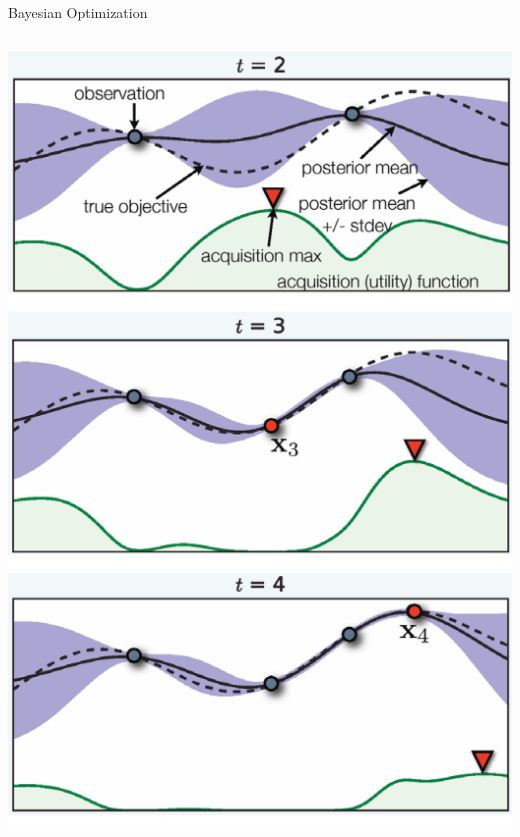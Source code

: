\begin{frame}[c,fragile]{Bayesian Optimization }

\begin{columns}


\includegraphics[width=\textwidth]{images/bo_pic1.png}\\
\pause
\includegraphics[width=\textwidth]{images/bo_pic2.png}\\
\pause
\includegraphics[width=\textwidth]{images/bo_pic3.png}
\pause


\end{columns}
\end{frame}
